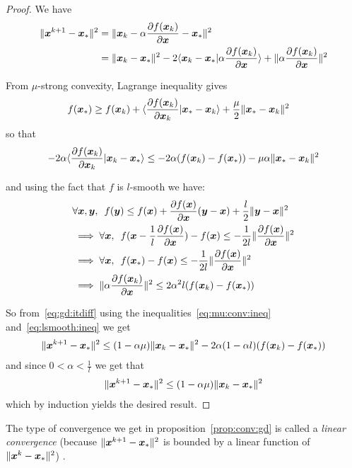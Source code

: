 \begin{proof}
  We have 
  \begin{align}
    \| \xb^{k+1} - \xb_* \|^2 &= \| \xb_k -\alpha \partialfrac{\xb}{f(\xb_k)} - \xb_* \|^2 \\
                            &= \| \xb_k - \xb_* \|^2  - 2 \langle \xb_k - \xb_* | \alpha \partialfrac{\xb}{f(\xb_k)} \rangle + \|\alpha \partialfrac{\xb}{f(\xb_k)} \|^2  \label{eq:gd:itdiff}
 \end{align}

 From $\mu$-strong convexity, Lagrange inequality gives
 \begin{align}
   &f(\xb_*) \geq f(\xb_k) + \langle \partialfrac{\xb_k}{f(\xb_k)} | \xb_* - \xb_k \rangle + \frac{\mu}{2} \|\xb_* - \xb_k \|^2
 \end{align}
 so that 
 \begin{align}
   -2 \alpha \langle \partialfrac{\xb_k}{f(\xb_k)} | \xb_k -  \xb_*\rangle \leq  -2 \alpha(f(\xb_k) - f(\xb_*)) - \mu \alpha \|\xb_* - \xb_k \|^2 \label{eq:mu:conv:ineq}
   \end{align}

   and using the fact that $f$ is $l$-smooth we have: 
   \begin{align}
     &\forall \xb, \yb, \enspace f(\yb) \leq f(\xb) + \partialfrac{\xb}{f(\xb)} (\yb - \xb) + \frac{l}{2} \| \yb - \xb \|^2 \\
     &\implies \forall \xb, \enspace f(\xb - \frac1{l} \partialfrac{\xb}{f(\xb)}) - f(\xb) \leq -\frac1{2l} \| \partialfrac{\xb}{f(\xb)} \|^2 \\
     &\implies \forall \xb, \enspace f(\xb_*) - f(\xb) \leq -\frac1{2l} \| \partialfrac{\xb}{f(\xb)} \|^2  \\
     &\implies \|\alpha \partialfrac{\xb}{f(\xb_k)} \|^2 \leq 2\alpha^2 l(f(\xb_k) - f(\xb_*)) \label{eq:lsmooth:ineq}
   \end{align}

   So from~\eqref{eq:gd:itdiff} using the inequalities~\eqref{eq:mu:conv:ineq}
   and~\eqref{eq:lsmooth:ineq} we get
   \begin{align}
     \| \xb^{k+1} - \xb_* \|^2 \leq (1 - \alpha \mu)\| \xb_k - \xb_* \|^2 -2 \alpha (1 - \alpha l) (f(\xb_k) - f(\xb_*))
   \end{align} 
   and since $0 < \alpha < \frac1{l}$ we get that 
   \begin{align}
     \| \xb^{k+1} - \xb_* \|^2 \leq (1 - \alpha \mu)\| \xb_k - \xb_* \|^2
   \end{align}
   which by induction yields the desired result.
\end{proof}
The type of convergence we get in proposition~\ref{prop:conv:gd} is called a
\emph{linear convergence} (because $\| \xb^{k+1} - \xb_*
\|^2$ is bounded by a linear function of  $\|\xb^{k} - \xb_* \|^2$) .

